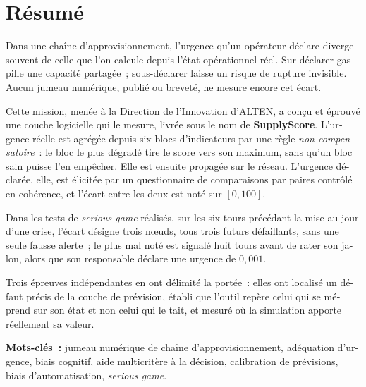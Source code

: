 \section*{R\'esum\'e}
\label{sec:resume_fr}

\begin{otherlanguage}{french}
Dans une cha\^ine d'approvisionnement, l'urgence qu'un op\'erateur d\'eclare diverge souvent
de celle que l'on calcule depuis l'\'etat op\'erationnel r\'eel. Sur-d\'eclarer gaspille une
capacit\'e partag\'ee~; sous-d\'eclarer laisse un risque de rupture invisible. Aucun jumeau
num\'erique, publi\'e ou brevet\'e, ne mesure encore cet \'ecart.

Cette mission, men\'ee \`a la Direction de l'Innovation d'ALTEN, a con\c{c}u et \'eprouv\'e
une couche logicielle qui le mesure, livr\'ee sous le nom de \textbf{SupplyScore}.
L'urgence r\'eelle est agr\'eg\'ee depuis six blocs
d'indicateurs par une r\`egle \emph{non compensatoire}~: le bloc le plus d\'egrad\'e tire le
score vers son maximum, sans qu'un bloc sain puisse l'en emp\^echer. Elle est ensuite
propag\'ee sur le r\'eseau. L'urgence d\'eclar\'ee, elle, est \'elicit\'ee par un
questionnaire de comparaisons par paires contr\^ol\'e en coh\'erence, et l'\'ecart entre les
deux est not\'e sur $[0,100]$.

Dans les tests de \emph{serious game} r\'ealis\'es, sur les six tours pr\'ec\'edant la mise au
jour d'une crise, l'\'ecart d\'esigne trois n\oe{}uds, tous trois futurs d\'efaillants, sans
une seule fausse alerte~; le plus mal not\'e est signal\'e huit tours avant de rater son
jalon, alors que son responsable d\'eclare une urgence de $0{,}001$.

Trois \'epreuves ind\'ependantes en ont d\'elimit\'e la port\'ee~: elles ont localis\'e un
d\'efaut pr\'ecis de la couche de pr\'evision, \'etabli que l'outil rep\`ere celui qui se
m\'eprend sur son \'etat et non celui qui le tait, et mesur\'e o\`u la simulation apporte
r\'eellement sa valeur.

\medskip

\noindent\textbf{Mots-cl\'es~:} jumeau num\'erique de cha\^ine d'approvisionnement,
ad\'equation d'urgence, biais cognitif, aide multicrit\`ere \`a la d\'ecision, calibration de
pr\'evisions, biais d'automatisation, \emph{serious game}.
\end{otherlanguage}

\vspace{0.3cm}

